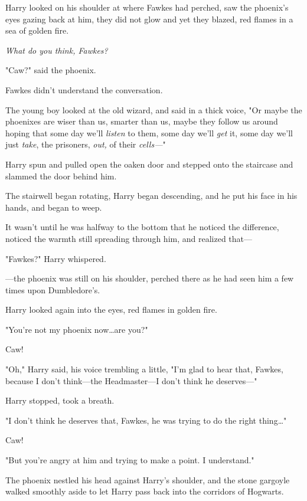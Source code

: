 Harry looked on his shoulder at where Fawkes had perched, saw the phoenix's
eyes gazing back at him, they did not glow and yet they blazed, red flames in a
sea of golden fire.

\emph{What do you think, Fawkes?}

"Caw?" said the phoenix.

Fawkes didn't understand the conversation.

The young boy looked at the old wizard, and said in a thick voice, "Or maybe
the phoenixes are wiser than us, smarter than us, maybe they follow us around
hoping that some day we'll \emph{listen} to them, some day we'll \emph{get} it,
some day we'll just \emph{take}, the prisoners, \emph{out,} of their
\emph{cells---}"

Harry spun and pulled open the oaken door and stepped onto the staircase and
slammed the door behind him.

The stairwell began rotating, Harry began descending, and he put his face in
his hands, and began to weep.

It wasn't until he was halfway to the bottom that he noticed the difference,
noticed the warmth still spreading through him, and realized that---

"Fawkes?" Harry whispered.

---the phoenix was still on his shoulder, perched there as he had seen him a
few times upon Dumbledore's.

Harry looked again into the eyes, red flames in golden fire.

"You're not my phoenix now…are you?"

Caw!

"Oh," Harry said, his voice trembling a little, "I'm glad to hear that, Fawkes,
because I don't think---the Headmaster---I don't think he deserves---"

Harry stopped, took a breath.

"I don't think he deserves that, Fawkes, he was trying to do the right
thing…"

Caw!

"But you're angry at him and trying to make a point. I understand."

The phoenix nestled his head against Harry's shoulder, and the stone gargoyle
walked smoothly aside to let Harry pass back into the corridors of Hogwarts.
